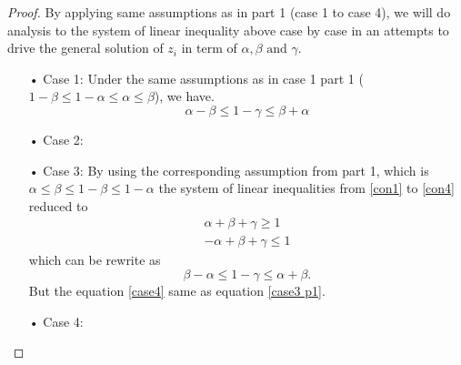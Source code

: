 \begin{proof}
By applying same assumptions as in part 1 (case 1 to case 4), we will do analysis to the system of linear  inequality above case by case in an attempts to drive the general solution of $z_i$ in term of $ \alpha, \beta \text{ and }\gamma$.
\begin{itemize}
\item[• Case 1:] Under the same assumptions as in case 1 part 1 ($1-\beta \leq 1-\alpha \leq \alpha \leq \beta$), we have.
\begin{equation}
\alpha-\beta \leq1-\gamma \leq \beta+\alpha
\end{equation}
\item[• Case 2:]

\item[• Case 3:] By using the corresponding  assumption from part 1, which is $\alpha\leq \beta \leq 1-\beta \leq 1-\alpha$ the system of linear inequalities from \ref{con1} to \ref{con4} reduced to
\begin{align}
\alpha+\beta+\gamma \geq 1\\
-\alpha+\beta+\gamma \leq 1
\end{align}
which can be rewrite as
\begin{equation}\label{case4}
\beta -\alpha \leq 1-\gamma \leq \alpha+\beta.
\end{equation}
But the equation  \ref{case4} same as equation \ref{case3 p1}.
\item[• Case 4:]
\end{itemize}
\end{proof}